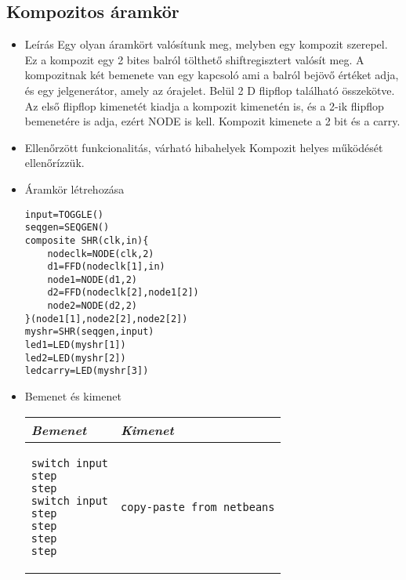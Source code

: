 \subsection{Kompozitos áramkör}
\begin{itemize}
\item Leírás\newline
Egy olyan áramkört valósítunk meg, melyben egy kompozit szerepel. Ez a kompozit egy 2 bites balról tölthető shiftregisztert valósít meg. A kompozitnak két bemenete van egy kapcsoló ami a balról bejövő értéket adja, és egy jelgenerátor, amely az órajelet. Belül 2 D flipflop található összekötve. Az első flipflop kimenetét kiadja a kompozit kimenetén is, és a 2-ik flipflop bemenetére is adja, ezért NODE is kell. Kompozit kimenete a 2 bit és a carry.
\item Ellenőrzött funkcionalitás, várható hibahelyek\newline
Kompozit helyes működését ellenőrízzük.

\item Áramkör létrehozása

\begin{verbatim}
input=TOGGLE()
seqgen=SEQGEN()
composite SHR(clk,in){		
    nodeclk=NODE(clk,2)		
    d1=FFD(nodeclk[1],in)		
    node1=NODE(d1,2)			
    d2=FFD(nodeclk[2],node1[2])
    node2=NODE(d2,2)			
}(node1[1],node2[2],node2[2])
myshr=SHR(seqgen,input)
led1=LED(myshr[1])
led2=LED(myshr[2])
ledcarry=LED(myshr[3])
\end{verbatim}

\item Bemenet és kimenet\newline

\begin{tabular}{|p{5cm}|p{5cm}|} 
\hline 
\textit{Bemenet} & \textit{Kimenet} \\ \hline
\begin{verbatim}
switch input
step
step
switch input
step
step
step
step
\end{verbatim}
& 
\begin{verbatim}
copy-paste from netbeans
\end{verbatim}
\\ \hline
\end{tabular}

\end{itemize}


